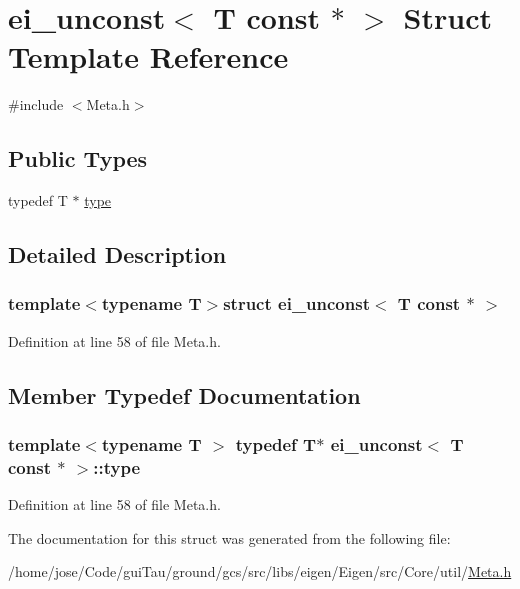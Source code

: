 \hypertarget{structei__unconst_3_01_t_01const_01_5_01_4}{\section{ei\-\_\-unconst$<$ T const $\ast$ $>$ Struct Template Reference}
\label{structei__unconst_3_01_t_01const_01_5_01_4}
}


{\ttfamily \#include $<$Meta.\-h$>$}

\subsection*{Public Types}
\begin{DoxyCompactItemize}
\item 
typedef T $\ast$ \hyperlink{structei__unconst_3_01_t_01const_01_5_01_4_a4986a91b1918bb806ee0f927c0fe2039}{type}
\end{DoxyCompactItemize}


\subsection{Detailed Description}
\subsubsection*{template$<$typename T$>$struct ei\-\_\-unconst$<$ T const $\ast$ $>$}



Definition at line 58 of file Meta.\-h.



\subsection{Member Typedef Documentation}
\hypertarget{structei__unconst_3_01_t_01const_01_5_01_4_a4986a91b1918bb806ee0f927c0fe2039}{
\subsubsection[{type}]{\setlength{\rightskip}{0pt plus 5cm}template$<$typename T $>$ typedef T$\ast$ {\bf ei\-\_\-unconst}$<$ T const $\ast$ $>$\-::{\bf type}}}\label{structei__unconst_3_01_t_01const_01_5_01_4_a4986a91b1918bb806ee0f927c0fe2039}


Definition at line 58 of file Meta.\-h.



The documentation for this struct was generated from the following file\-:\begin{DoxyCompactItemize}
\item 
/home/jose/\-Code/gui\-Tau/ground/gcs/src/libs/eigen/\-Eigen/src/\-Core/util/\hyperlink{_meta_8h}{Meta.\-h}\end{DoxyCompactItemize}
